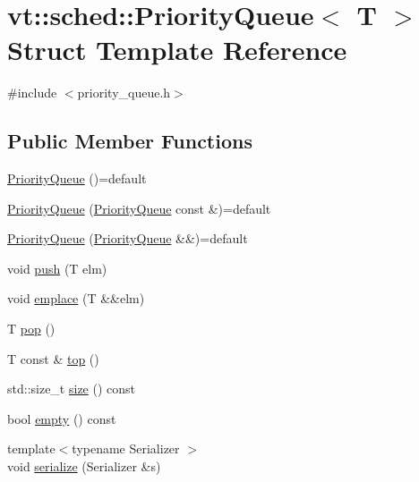\hypertarget{structvt_1_1sched_1_1_priority_queue}{}\section{vt\+:\+:sched\+:\+:Priority\+Queue$<$ T $>$ Struct Template Reference}
\label{structvt_1_1sched_1_1_priority_queue}


{\ttfamily \#include $<$priority\+\_\+queue.\+h$>$}

\subsection*{Public Member Functions}
\begin{DoxyCompactItemize}
\item 
\hyperlink{structvt_1_1sched_1_1_priority_queue_a03986418bd682344f22d1e0a5d4a3e3a}{Priority\+Queue} ()=default
\item 
\hyperlink{structvt_1_1sched_1_1_priority_queue_aca0fe178fbd601fa22816c2d895d5435}{Priority\+Queue} (\hyperlink{structvt_1_1sched_1_1_priority_queue}{Priority\+Queue} const \&)=default
\item 
\hyperlink{structvt_1_1sched_1_1_priority_queue_a25eedffc3b4665d0c1bb27027803e571}{Priority\+Queue} (\hyperlink{structvt_1_1sched_1_1_priority_queue}{Priority\+Queue} \&\&)=default
\item 
void \hyperlink{structvt_1_1sched_1_1_priority_queue_af532279184e76da6c72a52664d6a9922}{push} (T elm)
\item 
void \hyperlink{structvt_1_1sched_1_1_priority_queue_a152f4592447d7c478fe6aa0f8fbd5173}{emplace} (T \&\&elm)
\item 
T \hyperlink{structvt_1_1sched_1_1_priority_queue_aec357e1233dcb2991105795640372f8a}{pop} ()
\item 
T const  \& \hyperlink{structvt_1_1sched_1_1_priority_queue_ad5f072e3452ba8b950456bc4b072deb1}{top} ()
\item 
std\+::size\+\_\+t \hyperlink{structvt_1_1sched_1_1_priority_queue_a017313382884e652da648d274a09b80d}{size} () const
\item 
bool \hyperlink{structvt_1_1sched_1_1_priority_queue_aaee204c658c333cd9bb30615bcb35e07}{empty} () const
\item 
{\footnotesize template$<$typename Serializer $>$ }\\void \hyperlink{structvt_1_1sched_1_1_priority_queue_a8003054ebf860d24a7825783f90941d9}{serialize} (Serializer \&s)
\end{DoxyCompactItemize}
